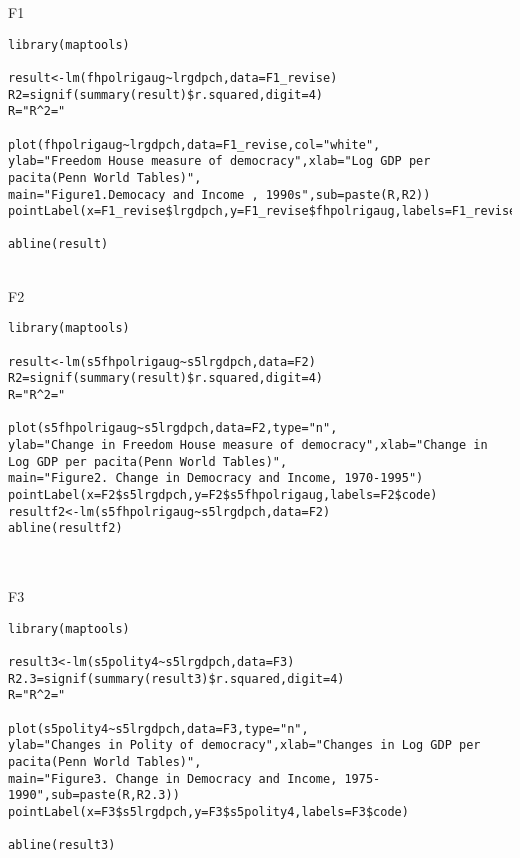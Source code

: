 \documentclass[a4paper,11pt]{article}
\begin{document}
\newpage

F1
\begin{lstlisting}
library(maptools)

result<-lm(fhpolrigaug~lrgdpch,data=F1_revise)
R2=signif(summary(result)$r.squared,digit=4)
R="R^2="

plot(fhpolrigaug~lrgdpch,data=F1_revise,col="white",
ylab="Freedom House measure of democracy",xlab="Log GDP per pacita(Penn World Tables)",
main="Figure1.Democacy and Income , 1990s",sub=paste(R,R2))
pointLabel(x=F1_revise$lrgdpch,y=F1_revise$fhpolrigaug,labels=F1_revise$code,col="black")

abline(result)

\end{lstlisting}

\\
F2
\begin{lstlisting}
library(maptools)

result<-lm(s5fhpolrigaug~s5lrgdpch,data=F2)
R2=signif(summary(result)$r.squared,digit=4)
R="R^2="

plot(s5fhpolrigaug~s5lrgdpch,data=F2,type="n",
ylab="Change in Freedom House measure of democracy",xlab="Change in Log GDP per pacita(Penn World Tables)",
main="Figure2. Change in Democracy and Income, 1970-1995")
pointLabel(x=F2$s5lrgdpch,y=F2$s5fhpolrigaug,labels=F2$code)
resultf2<-lm(s5fhpolrigaug~s5lrgdpch,data=F2)
abline(resultf2)


\end{lstlisting}

\\
F3
\begin{lstlisting}
library(maptools)

result3<-lm(s5polity4~s5lrgdpch,data=F3)
R2.3=signif(summary(result3)$r.squared,digit=4)
R="R^2="

plot(s5polity4~s5lrgdpch,data=F3,type="n",
ylab="Changes in Polity of democracy",xlab="Changes in Log GDP per pacita(Penn World Tables)",
main="Figure3. Change in Democracy and Income, 1975-1990",sub=paste(R,R2.3))
pointLabel(x=F3$s5lrgdpch,y=F3$s5polity4,labels=F3$code)

abline(result3)


\end{lstlisting}
\end{document}

